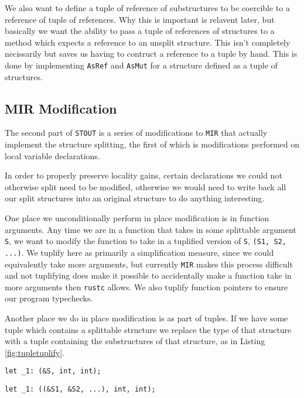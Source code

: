 \documentclass[prodmode,acmtecs]{acmsmall} %
\newcommand{\rustcname}{{\texttt{rustc}}}
\def \rustc {\rustcname{}\xspace}
\newcommand{\mirname}{{\texttt{MIR}}}
\def \mir {\mirname{}\xspace}
\newcommand{\projectname}{{\texttt{STOUT}}}
\def \name{\projectname\xspace}
\begin{document}
We also want to define a tuple of reference of substructures 
to be coercible to a reference of tuple of references. Why this is 
important is relavent later, but basically
we want the ability to pass a tuple of references 
of structures to a method which expects a reference to an 
unsplit structure. This isn't completely necissarily but 
saves us having to contruct a reference to a tuple by hand.
This is done by implementing \texttt{AsRef} and \texttt{AsMut}
for a structure defined as a tuple of structures.

\subsection{MIR Modification}

The second part of \name is a series of modifications to \mir that actually
implement the structure splitting, the first of which is modifications performed on
local variable declarations.

In order to properly preserve locality gains, certain declarations
we could not otherwise split need to be modified, otherwise we would need
to write back all our split structures into an original structure to
do anything interesting.

One place we unconditionally perform in place modification is in function
arguments. Any time we are in a function that takes in some splittable
argument \texttt{S}, we want to modify the function to take 
in a tuplified version of \texttt{S}, \texttt{(S1, S2, ...)}. 
We tuplify here as primarily a simplification measure, since 
we could equivalently take more arguments, but currently
\mir makes this process difficult and
not tuplifying does make it possible to accidentally make a function
take in more arguments then \rustc allows.
We also tuplify function pointers to ensure our program typechecks.

Another place we do in place modification is as part of tuples. If we have some
tuple which contains a splittable structure we replace the type of that
structure with a tuple containing the substructures of that structure, as 
in Listing \ref{fig:tupletuplify}.

\begin{figure*}[p]
  \begin{minipage}[t]{0.5\linewidth}
\begin{verbatim}
let _1: (&S, int, int);
\end{verbatim}
  \end{minipage}
  \begin{minipage}[t]{0.5\linewidth}
\begin{verbatim}
let _1: ((&S1, &S2, ...), int, int);
\end{verbatim}
  \end{minipage}
  \caption{Tuple Modification}
  \label{fig:tupletuplify}
\end{figure*}
\end{document}
